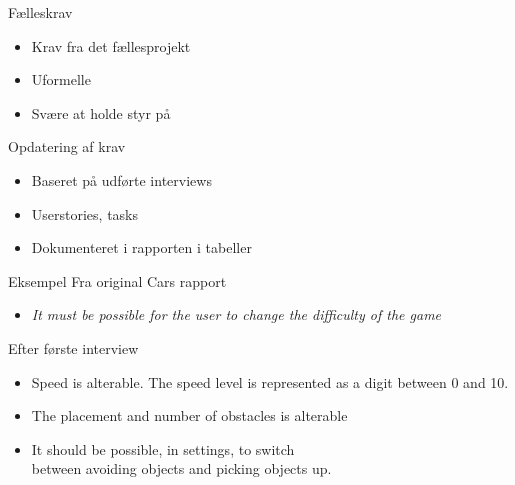 \begin{frame}{Fælleskrav}
\begin{itemize}
\item Krav fra det fællesprojekt
\item Uformelle 
\item Svære at holde styr på
\end{itemize}
\end{frame}

\begin{frame}{Opdatering af krav}
\begin{itemize}
\item Baseret på udførte interviews
\item Userstories, tasks
\item Dokumenteret i rapporten i tabeller
\end{itemize}
\end{frame}

\begin{frame}{Eksempel}
Fra original Cars rapport
\begin{itemize}
\item \textit{It must be possible for the user to change the difficulty of the game}
\end{itemize}

Efter første interview
\begin{itemize}
\item Speed is alterable. The speed level is represented as a digit between 0 and 10.
\item The placement and number of obstacles is alterable
\item It should be possible, in settings, to switch\\ between avoiding objects and picking objects up.
\end{itemize}
\end{frame}
